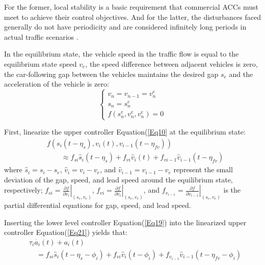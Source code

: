 \documentclass[journal]{IEEEtran}
\begin{document}
For the former, local stability is a basic requirement that commercial ACCs must meet to achieve their control objectives. And for the latter, the disturbances faced generally do not have periodicity and are considered infinitely long periods in actual traffic scenarios \citep{Bian2019,Xiao2011}.

In the equilibrium state, the vehicle speed in the traffic flow is equal to the equilibrium state speed $v_e$, the speed difference between adjacent vehicles is zero, the car-following gap between the vehicles maintains the desired gap $s_e$ and the acceleration of the vehicle is zero:
\begin{equation}
  \left\{\begin{array}{l}
    v_{n}=v_{n-1}=v_{n}^{e} \\
    s_{n}=s_{n}^{e}         \\
    f\left(s_{n}^{e}, v_{n}^{e}, v_{n}^{e}\right)=0
  \end{array}\right.
  \label{Eq20}
\end{equation}

First, linearize the upper controller Equation(\ref{Eq10} at the equilibrium state:
\begin{equation}
  \begin{aligned}
     & f\left(s_i\left(t-\eta_s\right),v_i\left(t\right),v_{i-1}\left(t-\eta_{fv}\right)\right)                                                   \\
     & \quad \quad \approx f_{si}{\hat{s}}_i\left(t-\eta_s\right)+f_{vi}{\hat{v}}_i\left(t\right)+f_{vi-1}{\hat{v}}_{i-1}\left(t-\eta_{fv}\right)
  \end{aligned}
  \label{Eq21}
\end{equation}
where ${\hat{s}}_i=s_i-s_e$, ${\hat{v}}_i=v_i-v_e$, and ${\hat{v}}_{i-1}=v_{i-1}-v_e$ represent the small deviation of the gap, speed, and lead speed around the equilibrium state, respectively; $f_{si}=\left.\frac{\partial f}{\partial v_i}\right|_{\left(s_e,v_e\right)}$, $f_{vi}=\left.\frac{\partial f}{\partial v_i}\right|_{\left(s_e,v_e\right)}$, and $f_{v_{i-1}}=\left.\frac{\partial f}{\partial v_{i-1}}\right|_{\left(s_e,v_e\right)}$ is the partial differential equations for gap, speed, and lead speed.

Inserting the lower level controller Equation(\ref{Eq19}) into the linearized upper controller Equation(\ref{Eq21}) yields that:
\begin{equation}
  \begin{aligned}
     & \tau_i\dot{a_i}\left(t\right)+a_i\left(t\right) \\ & \quad =f_{si}{\hat{s}}_i\left(t-\eta_s-\phi_i\right)+f_{vi}{\hat{v}}_i\left(t-\phi_i\right)+f_{v_{i-1}}{\hat{v}}_{i-1}\left(t-\eta_{fv}-\phi_i\right)
  \end{aligned}
  \label{Eq22}
\end{equation}
\end{document}
